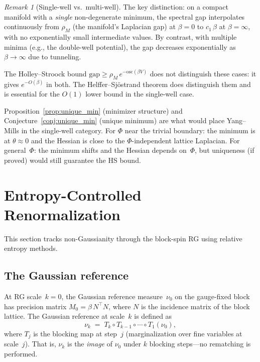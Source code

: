 \documentclass[11pt,a4paper]{article}
\theoremstyle{plain}
\theoremstyle{definition}
\theoremstyle{remark}
\newtheorem{remark}[theorem]{Remark}
\newcommand{\osc}{\mathrm{osc}}
\newcommand{\gap}{\mathrm{gap}}
\begin{document}
\begin{remark}[Single-well vs.\ multi-well]\label{rem:mechanism}
The key distinction: on a compact manifold with a
\emph{single} non-degenerate minimum, the spectral gap
interpolates continuously from $\rho_M$ (the manifold's
Laplacian gap) at $\beta = 0$ to $c_1\,\beta$ at
$\beta = \infty$, with no exponentially small intermediate
values.  By contrast, with multiple minima (e.g., the
double-well potential), the gap decreases exponentially as
$\beta \to \infty$ due to tunneling.

The Holley--Stroock bound $\gap \geq \rho_M\,e^{-\osc(\beta V)}$
does not distinguish these cases: it gives $e^{-O(\beta)}$
in both.  The Helffer--Sj\"ostrand theorem does distinguish
them and is essential for the $O(1)$ lower bound in the
single-well case.

Proposition~\ref{prop:unique_min} (minimizer structure) and
Conjecture~\ref{conj:unique_min} (unique minimum) are what
would place Yang--Mills in the single-well category.
For $\Phi$ near the trivial boundary: the minimum is at
$\theta \approx 0$ and the Hessian is close to the
$\Phi$-independent lattice Laplacian.  For general~$\Phi$:
the minimum shifts and the Hessian depends on~$\Phi$, but
uniqueness (if proved) would still guarantee the HS bound.
\end{remark}


\section{Entropy-Controlled Renormalization}\label{sec:entropy}

This section tracks non-Gaussianity
through the block-spin RG using relative entropy methods.

\subsection{The Gaussian reference}

At RG scale~$k = 0$, the Gaussian reference
measure~$\nu_0$ on the gauge-fixed block has
precision matrix $M_0 = \beta\,N^\top N$, where
$N$ is the incidence matrix of the block lattice.
The Gaussian reference at scale~$k$ is defined as
\begin{equation}\label{eq:nu_k}
  \nu_k \;=\; T_k \circ T_{k-1} \circ \cdots
  \circ T_1(\nu_0),
\end{equation}
where $T_j$ is the blocking map at step~$j$
(marginalization over fine variables at scale~$j$).
That is, $\nu_k$ is the \emph{image} of $\nu_0$
under $k$ blocking steps---no rematching is performed.
\end{document}
